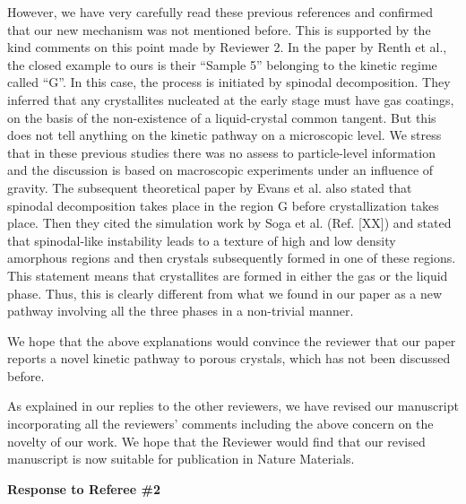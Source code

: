 \documentclass[11pt]{article}
\begin{document}
However, we have very carefully read these previous references and confirmed that our new mechanism was not mentioned before. This is supported by the kind comments on this point made by Reviewer 2. In the paper by Renth et al., the closed example to ours is their “Sample 5” belonging to the kinetic regime called “G”. In this case, the process is initiated by spinodal decomposition. They inferred that any crystallites nucleated at the early stage must have gas coatings, on the basis of the non-existence of a liquid-crystal common tangent. But this does not tell anything on the kinetic pathway on a microscopic level. We stress that in these previous studies there was no assess to particle-level information and the discussion is based on macroscopic experiments under an influence of gravity. The subsequent theoretical paper by Evans et al. also stated that spinodal decomposition takes place in the region G before crystallization takes place. Then they cited the simulation work by Soga et al. (Ref. [XX]) and stated that spinodal-like instability leads to a texture of high and low density amorphous regions and then crystals subsequently formed in one of these regions. This statement means that crystallites are formed in either the gas or the liquid phase. Thus, this is clearly different from what we found in our paper as a new pathway involving all the three phases in a non-trivial manner. 

We hope that the above explanations would convince the reviewer that our paper reports a novel kinetic pathway to porous crystals, which has not been discussed before. 

As explained in our replies to the other reviewers, we have revised our manuscript incorporating all the reviewers’ comments including the above concern on the novelty of our work. We hope that the Reviewer would find that our revised manuscript is now suitable for publication in Nature Materials. 


\clearpage

\noindent
\begin{Large}
{\bf Response to Referee \#2}
\end{Large}


\vspace{1em}

\singlespacing
\end{document}
